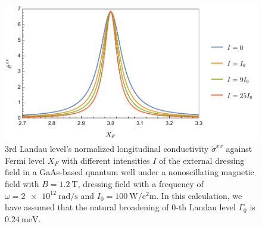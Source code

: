 \begin{figure}[t]
\includegraphics[scale=0.575]{figures/fig_5}
\caption{$3$rd Landau level’s normalized longitudinal conductivity $\widetilde{\sigma}^{xx}$ against Fermi level $X_F$ with different intensities $I$ of the external dressing field in a GaAs-based quantum well under a nonoscillating magnetic field with $B = \SI{1.2}{\tesla}$, dressing field with a frequency of $\omega =\SI{2e12}{\radian\per\second}$ and $I_0 =\SI{100}{\watt\per\square\centi\metre}$.
In this calculation, we have assumed that the natural  broadening of $0$-th Landau level $\Gamma_0$ is $\SI{0.24}{\milli\eV}$.}
\label{fig:6}
\end{figure}
